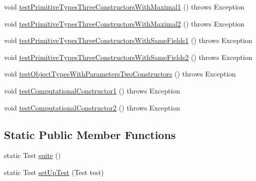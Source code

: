 \begin{DoxyCompactItemize}
\item 
void \hyperlink{classedu_1_1illinois_1_1canistelCassabanana_1_1tests_1_1RemoveDuplicateCodeInConstructorsRefactoringTests_a0e9308bcca1cb335ba5a7f7c263d2ac5}{testPrimitiveTypesThreeConstructorsWithMaximal1} ()  throws Exception 
\item 
void \hyperlink{classedu_1_1illinois_1_1canistelCassabanana_1_1tests_1_1RemoveDuplicateCodeInConstructorsRefactoringTests_a885c02b65cfeeb832428fdce080882e9}{testPrimitiveTypesThreeConstructorsWithMaximal2} ()  throws Exception 
\item 
void \hyperlink{classedu_1_1illinois_1_1canistelCassabanana_1_1tests_1_1RemoveDuplicateCodeInConstructorsRefactoringTests_abec9de907f2c8e893351959365abade5}{testPrimitiveTypesThreeConstructorsWithSameFields1} ()  throws Exception 
\item 
void \hyperlink{classedu_1_1illinois_1_1canistelCassabanana_1_1tests_1_1RemoveDuplicateCodeInConstructorsRefactoringTests_a5025fece6adcfc2d6f4a405bf6e89e89}{testPrimitiveTypesThreeConstructorsWithSameFields2} ()  throws Exception 
\item 
void \hyperlink{classedu_1_1illinois_1_1canistelCassabanana_1_1tests_1_1RemoveDuplicateCodeInConstructorsRefactoringTests_a8ce024d895ab6486627105868561a1e3}{testObjectTypesWithParametersTwoConstructors} ()  throws Exception 
\item 
void \hyperlink{classedu_1_1illinois_1_1canistelCassabanana_1_1tests_1_1RemoveDuplicateCodeInConstructorsRefactoringTests_ae4a827bef441db2b76f74c7b2f971c0a}{testComputationalConstructor1} ()  throws Exception 
\item 
void \hyperlink{classedu_1_1illinois_1_1canistelCassabanana_1_1tests_1_1RemoveDuplicateCodeInConstructorsRefactoringTests_a5b67abcdbc9cc241b2c23944b16eafd5}{testComputationalConstructor2} ()  throws Exception 
\end{DoxyCompactItemize}
\subsection*{Static Public Member Functions}
\begin{DoxyCompactItemize}
\item 
static Test \hyperlink{classedu_1_1illinois_1_1canistelCassabanana_1_1tests_1_1RemoveDuplicateCodeInConstructorsRefactoringTests_aa4dbfb99e813da80d6a7315bb6229ec1}{suite} ()
\item 
static Test \hyperlink{classedu_1_1illinois_1_1canistelCassabanana_1_1tests_1_1RemoveDuplicateCodeInConstructorsRefactoringTests_ab5b5ba61d920f31a03d1717be728be07}{setUpTest} (Test test)
\end{DoxyCompactItemize}
